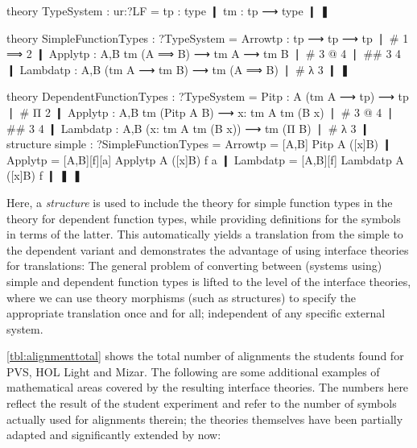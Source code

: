 \begin{mmtcode}[caption= {Interface Theories for Type-Theoretical Foundations\protect\footnotemark},label=fig:typeinterface]
theory TypeSystem : ur:?LF =
	tp : type ❙
	tm : tp ⟶ type ❙
❚

theory SimpleFunctionTypes : ?TypeSystem =
	Arrowtp : tp ⟶ tp ⟶ tp ❘ # 1 ⟹ 2 ❙
	Applytp : {A,B} tm (A ⟹ B) ⟶ tm A ⟶ tm B ❘ # 3 @ 4 ❘ ## 3 4 ❙
	Lambdatp : {A,B} (tm A ⟶ tm B) ⟶ tm (A ⟹ B) ❘ # λ 3 ❙
❚
	
theory DependentFunctionTypes : ?TypeSystem =
	Pitp : {A} (tm A ⟶ tp) ⟶ tp ❘ # Π 2 ❙
	Applytp : {A,B} tm (Pitp A B) ⟶ {x: tm A} tm (B x) ❘ # 3 @ 4 ❘ ## 3 4 ❙
	Lambdatp : {A,B} ({x: tm A} tm (B x)) ⟶ tm (Π B) ❘ # λ 3 ❙
	structure simple : ?SimpleFunctionTypes =
		Arrowtp = [A,B] Pitp A ([x]B) ❙
		Applytp = [A,B][f][a] Applytp A ([x]B) f a ❙
		Lambdatp = [A,B][f] Lambdatp A ([x]B) f ❙
	❚
❚


\end{mmtcode}


Here, a \emph{structure} is used to include the theory for simple function types in the theory for dependent function types, while providing definitions for the symbols in terms of the latter. This automatically yields a translation from the simple to the dependent variant and demonstrates the advantage of using interface theories for translations: The general problem of converting between (systems using) simple and dependent function types is lifted to the level of the interface theories, where we can use theory morphisms (such as structures) to specify the appropriate translation once and for all; independent of any specific external system.\medskip

\autoref{tbl:alignmenttotal} shows the total number of alignments the students found for PVS, HOL Light and Mizar. The following are some additional examples of mathematical areas covered by the resulting interface theories. The numbers here reflect the result of the student experiment and refer to the number of symbols actually used for alignments therein; the theories themselves have been partially adapted and significantly extended by now:

